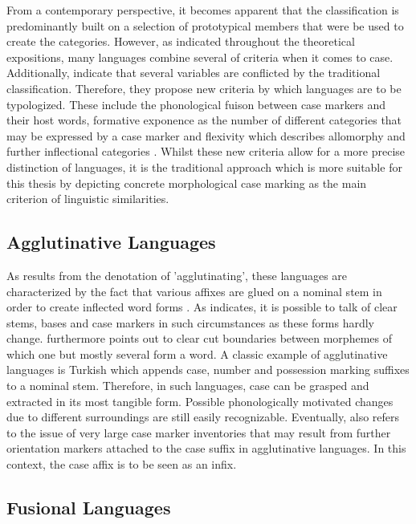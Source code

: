 \documentclass[11pt,a4paper,twoside,openright]{scrbook}
\begin{document}
From a contemporary perspective, it becomes apparent that the classification is predominantly built on a selection of prototypical members that were be used to create the categories. However, as indicated throughout the theoretical expositions, many languages combine several of criteria when it comes to case. Additionally, \citet{bickelwals20} indicate that several variables are conflicted by the traditional classification. Therefore, they propose new criteria by which languages are to be typologized. These include the phonological fuison between case markers and their host words, formative exponence as the number of different categories that may be expressed by a case marker and flexivity which describes allomorphy and further inflectional categories \citep{bickelwals20}. Whilst these new criteria allow for a more precise distinction of languages, it is the traditional approach which is more suitable for this thesis by depicting concrete morphological case marking as the main criterion of linguistic similarities.


\subsection{Agglutinative Languages}

As results from the denotation of 'agglutinating', these languages are characterized by the fact that various affixes are glued on a nominal stem in order to create inflected word forms \citep{comrie1989typol}. As \citet{blake2012hbocas} indicates, it is possible to talk of clear stems, bases and case markers in such circumstances as these forms hardly change. \citet{comrie1989typol} furthermore points out to clear cut boundaries between morphemes of which one but mostly several form a word. A classic example of agglutinative languages is Turkish which appends case, number and possession marking suffixes to a nominal stem. Therefore, in such languages, case can be grasped and extracted in its most tangible form. Possible phonologically motivated changes due to different surroundings are still easily recognizable. Eventually, \citet{blake2012hbocas} also refers to the issue of very large case marker inventories that may result from further orientation markers attached to the case suffix in agglutinative languages. In this context, the case affix is to be seen as an infix.




\subsection{Fusional Languages}
\end{document}
